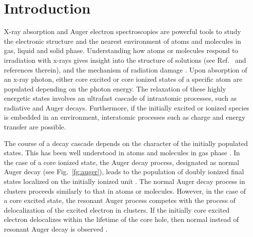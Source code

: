 \section{Introduction}

X-ray absorption and Auger electron spectroscopies are powerful tools to study the electronic structure and the nearest environment of atoms and molecules in gas, liquid and solid phase. Understanding how atoms or molecules respond to irradiation with x-rays gives insight into the structure of solutions (see Ref.\ \citep{smith17:13909} and references therein), and the mechanism of radiation damage \citep{ONeill02:329,Carugo05:213,Stumpf16:237}. Upon absorption of an x-ray photon, either core excited or core ionized states of a specific atom are populated depending on the photon energy. The relaxation of these highly energetic states involves an ultrafast cascade of intraatomic processes, such as radiative and Auger decays. Furthermore, if the initially excited or ionized species is embedded in an environment, interatomic processes such as charge and energy transfer \citep{Pokapanich09:7264,Pokapanich11:13430,Stumpf16:237,unger17:708,ceolin17:263003} are possible.


The course of a decay cascade depends on the character of the initially populated states. This has been well understood in atoms and molecules in gas phase  \citep{stoychev08:074307,Demekhin08:043421,Demekhin09:104303,Ouchi11:053415,Miteva14:164303,travnikova16:213001,Gokhberg14:661,Trinter14:664}. In the case of a core ionized state, the Auger decay process, designated as normal Auger decay (see Fig.\ \ref{fg:auger}), leads to the population of doubly ionized final states localized on the initially ionized unit \citep{stoychev08:074307,Demekhin08:043421,Demekhin09:104303,Ouchi11:053415}.  The normal Auger decay process in clusters proceeds similarly to that in atoms or molecules. However, in the case of a core excited state, the resonant Auger process competes with the process of delocalization of the excited electron in clusters. If the initially core excited electron delocalizes within the lifetime of the core hole, then normal instead of resonant Auger decay is observed \citep{Bjorneholm95:3017}. 



